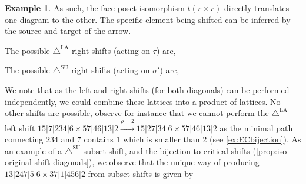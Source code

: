 \documentclass{amsart}
\theoremstyle{definition}
\newtheorem{example}[theorem]{Example}
\newcommand{\SUD}{\triangle^{\mathrm{SU}}}
\newcommand{\LAD}{\triangle^{\mathrm{LA}}}
\begin{document}
\begin{example}
As such, the face poset isomorphism $t(r\times r)$ directly translates one diagram to the other.
The specific element being shifted can be inferred by the source and target of the arrow.
\begin{center}
{\small
{}
}
\end{center}
The possible $\LAD$ right shifts (acting on $\tau$)  are,
\begin{center}
\end{center}
The possible $\SUD$ right shifts (acting on $\sigma'$) are,
\begin{center}
\end{center}
We note that as the left and right shifts (for both diagonals) can be performed independently, we could combine these lattices into a product of lattices. 
No other shifts are possible, observe for instance that we cannot perform the $\LAD$ left shift $15|7|234|6 \times 57|46|13|2 \xrightarrow{\rho=2} 15|27|34|6 \times 57|46|13|2$ as the minimal path connecting $234$ and $7$ contains $1$ which is smaller than $2$ (see \cref{ex:ECbijection}).
As an example of a $\SUD$ subset shift, and the bijection to critical shifts (\cref{prop:iso-original-shift-diagonals}), we observe that the unique way of producing $13|247|5|6 \times 37|1|456|2$ from subset shifts is given by

\end{example}
\end{document}
